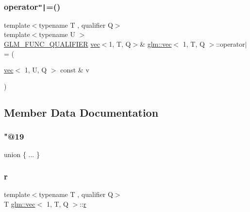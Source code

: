 \mbox{\label{structglm_1_1vec_3_011_00_01_t_00_01_q_01_4_ae04eabedc72a049a89d3c54b65a2b99a}} 
\subsubsection{\texorpdfstring{operator\texttt{"|}=()}{operator|=()}\hspace{0.1cm}{\footnotesize\ttfamily [4/4]}}
{\footnotesize\ttfamily template$<$typename T , qualifier Q$>$ \\
template$<$typename U $>$ \\
\mbox{\hyperlink{setup_8hpp_a33fdea6f91c5f834105f7415e2a64407}{G\+L\+M\+\_\+\+F\+U\+N\+C\+\_\+\+Q\+U\+A\+L\+I\+F\+I\+ER}} \mbox{\hyperlink{structglm_1_1vec}{vec}}$<$1, T, Q$>$\& \mbox{\hyperlink{structglm_1_1vec}{glm\+::vec}}$<$ 1, T, Q $>$\+::operator$\vert$= (\begin{DoxyParamCaption}\item[{\mbox{\hyperlink{structglm_1_1vec}{vec}}$<$ 1, U, Q $>$ const \&}]{v }\end{DoxyParamCaption})}



\subsection{Member Data Documentation}
\mbox{\label{structglm_1_1vec_3_011_00_01_t_00_01_q_01_4_a2851f4411b7dcae87f245ca5129ce828}} 
\subsubsection{\texorpdfstring{"@19}{@19}}
{\footnotesize\ttfamily union \{ ... \} }

\mbox{\label{structglm_1_1vec_3_011_00_01_t_00_01_q_01_4_ad023565c535d96362539e4a4a21eb34c}} 
\subsubsection{\texorpdfstring{r}{r}}
{\footnotesize\ttfamily template$<$typename T , qualifier Q$>$ \\
T \mbox{\hyperlink{structglm_1_1vec}{glm\+::vec}}$<$ 1, T, Q $>$\+::\mbox{\hyperlink{_s_d_l__opengl_8h_a42ce7cdc612e53abee15043f80220d97}{r}}}

